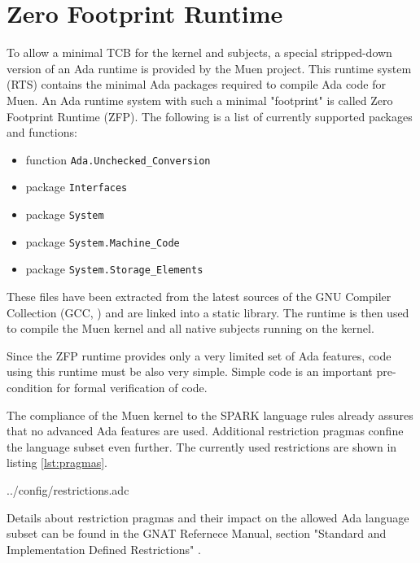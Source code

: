 \section{Zero Footprint Runtime}\label{sec:zfs-rts}
To allow a minimal TCB for the kernel and subjects, a special stripped-down
version of an Ada runtime is provided by the Muen project. This
runtime system (RTS) contains the minimal Ada packages required
to compile Ada code for Muen. An Ada runtime system with such a minimal
"footprint" is called Zero Footprint Runtime (ZFP). The following is
a list of currently supported packages and functions:

\begin{itemize}
	\item function \texttt{Ada.Unchecked\_Conversion}
	\item package \texttt{Interfaces}
	\item package \texttt{System}
	\item package \texttt{System.Machine\_Code}
	\item package \texttt{System.Storage\_Elements}
\end{itemize}

These files have been extracted from the latest sources of the GNU Compiler
Collection (GCC, \cite{gcc}) and are linked into a static library.
The runtime is then used to compile the Muen kernel and all native subjects
running on the kernel.

Since the ZFP runtime provides only a very limited set of Ada features, code
using this runtime must be also very simple. Simple code is an important
pre-condition for formal verification of code.

The compliance of the Muen kernel to the SPARK language rules
already assures that no advanced Ada features are used. Additional restriction
pragmas confine the language subset even further. The currently
used restrictions are shown in listing \ref{lst:pragmas}.


	{../config/restrictions.adc}

Details about restriction pragmas and their impact on the allowed Ada language
subset can be found in the GNAT Refernece Manual, section "Standard and
Implementation Defined Restrictions" \cite{GNAT:manual}.
